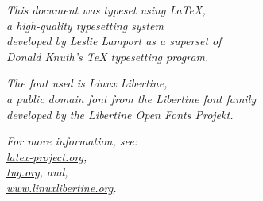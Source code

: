 \documentclass[00-main.tex]{subfiles}
\begin{document}
\clearpage

\vfill

\small

\begin{center}

\noindent\emph{This document was typeset using {\em\LaTeX\/},\\ a high-quality typesetting system\\  developed by Leslie Lamport as a superset of\\ Donald Knuth's {\em\TeX\/} typesetting program.}

\bigskip

\emph{The font used is Linux Libertine,\\ a public domain font from the Libertine font family\\ developed by the {\em Libertine Open Fonts Projekt}.}

\bigskip

\emph{For more information, see:\\ 
\href{latex-project.org}{latex-project.org},\\
\href{tug.org}{tug.org}, and,\\ \href{www.linuxlibertine.org}{www.\hspace{0em}linuxlibertine.\hspace{0em}org}.}

\end{center}
\normalsize

\vfill

\cleardoublepage

\tableofcontents

\cleardoublepage
\end{document}
